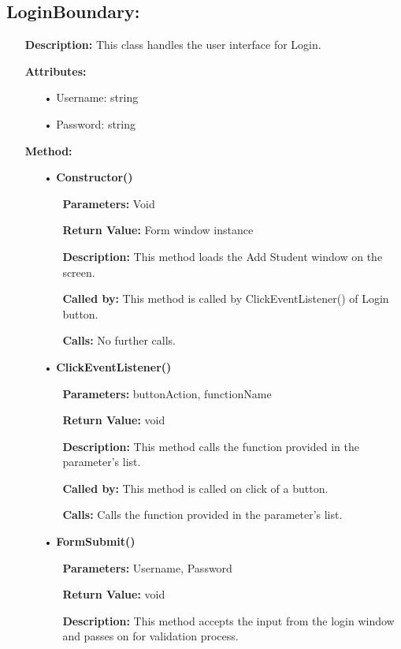 \documentclass{scrreprt}
\begin{document}
\subsection{LoginBoundary: }
\begin{enumerate}
\item[] \textbf{Description:} This class handles the user interface for Login.
\item[] \textbf{Attributes:} 
\begin{itemize}
\item [•] Username: string
\item [•] Password: string
\end{itemize}
\textbf{Method:}
\begin{itemize}
\item [•] \textbf{Constructor()}
\begin{itemize}
\item [] \textbf{Parameters:} Void 
\item [] \textbf{Return Value:} Form window instance
\item [] \textbf{Description:} This method loads the Add Student window on the screen.
\item [] \textbf{Called by:} This method is called by ClickEventListener() of Login button.
\item [] \textbf{Calls:} No further calls.
\end{itemize}
\item [•] \textbf{ClickEventListener()}
\begin{itemize}
\item [] \textbf{Parameters:} buttonAction, functionName 
\item [] \textbf{Return Value:} void
\item [] \textbf{Description:} This method calls the function provided in the parameter's list.
\item [] \textbf{Called by:} This method is called on click of a button.
\item [] \textbf{Calls:} Calls the function provided in the parameter's list.  
\end{itemize}
\item [•] \textbf{FormSubmit()}
\begin{itemize}
\item [] \textbf{Parameters:} Username, Password
\item [] \textbf{Return Value:} void
\item [] \textbf{Description:} This method accepts the input from the login window and passes on for validation process.

\end{itemize}
\end{itemize}
\end{enumerate}
\end{document}
